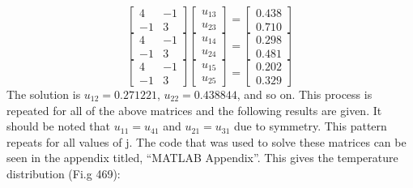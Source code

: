 \begin{equation*}
\begin{bmatrix}
4 & -1 \\ -1 & 3 
\end{bmatrix}
\begin{bmatrix}
u_{13} \\ u_{23}
\end{bmatrix}
=
\begin{bmatrix}
0.438 \\ 0.710
\end{bmatrix}
\end{equation*}
\begin{equation*}
\begin{bmatrix}
4 & -1 \\ -1 & 3 
\end{bmatrix}
\begin{bmatrix}
u_{14} \\ u_{24}
\end{bmatrix}
=
\begin{bmatrix}
0.298 \\ 0.481
\end{bmatrix}
\end{equation*}
\begin{equation*}
\begin{bmatrix}
4 & -1 \\ -1 & 3 
\end{bmatrix}
\begin{bmatrix}
u_{15} \\ u_{25}
\end{bmatrix}
=
\begin{bmatrix}
0.202 \\ 0.329
\end{bmatrix}
\end{equation*}
The solution is $u_{12}=0.271221$, $u_{22}=0.438844$, and so on. This process is repeated for all of the above matrices and the following results are given. It should be noted that $u_{11}=u_{41}$ and $u_{21}=u_{31}$ due to symmetry. This pattern repeats for all values of j. The code that was used to solve these matrices can be seen in the appendix titled, ``MATLAB Appendix''. This gives the temperature distribution (Fi.g 469):
